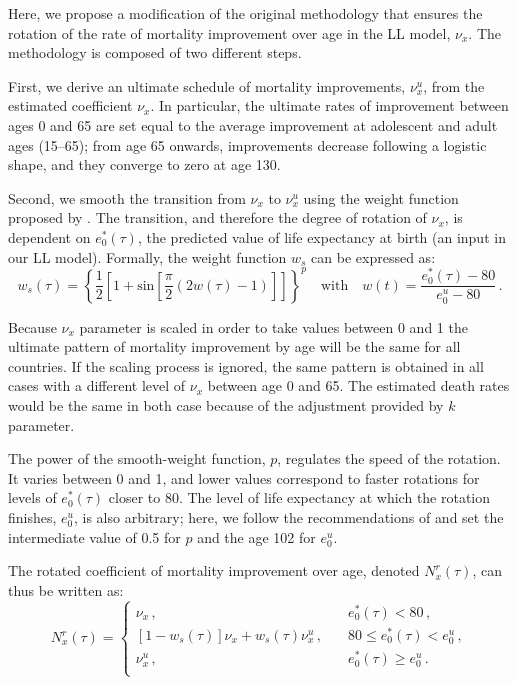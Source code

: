 \documentclass[risks,article,submit,moreauthors,pdftex]{Definitions/mdpi}
\begin{document}
Here, we propose a modification of the original \cite{li2013} methodology that ensures the rotation of the rate of mortality improvement over age in the LL model, $\nu_x$. The methodology is composed of two different steps.

First, we derive an ultimate schedule of mortality improvements, $\nu^u_x$,  from the estimated coefficient $\nu_x$. In particular, the ultimate rates of improvement between ages 0 and 65 are set equal to the average improvement at adolescent and adult ages (15--65); from age 65 onwards, improvements decrease following a logistic shape, and they converge to zero at age 130. 

Second, we smooth the transition from $\nu_x$ to $\nu^u_x$ using the weight function proposed by \cite{li2013}. The transition, and therefore the degree of rotation of $\nu_x$, is dependent on $e^*_0(\tau)$, the predicted value of life expectancy at birth (an input in our LL model). Formally, the weight function $w_s$ can be expressed as:
\begin{equation}
\label{Eq:ws}
  w_s(\tau)= \left \{ \frac{1}{2} \left [ 1 + \mathrm{sin}  \left [ \frac{\pi}{2} \left ( 2w(\tau) - 1 \right ) \right ]  \right ] \right \}^p \quad \textrm{with} \quad w(t) = \frac{e^*_0(\tau)-80}{e^u_0-80} \, .
\end{equation}

Because $\nu_x$ parameter is scaled in order to take values between 0 and 1 the ultimate pattern of mortality improvement by age will be the same for all countries. If the scaling process is ignored, the same pattern is obtained in all cases with a different level of $\nu_x$ between age 0 and 65. The estimated death rates would be the same in both case because of the adjustment provided by $k$ parameter.  

The power of the smooth-weight function, $p$, regulates the speed of the rotation. It varies between 0 and 1, and lower values correspond to faster rotations for levels of $e^*_0(\tau)$ closer to 80. The level of life expectancy at which the rotation finishes, $e^u_0$, is also arbitrary; here, we follow the recommendations of \cite{li2013} and set the intermediate value of 0.5 for $p$ and the age 102 for $e^u_0$.

The rotated coefficient of mortality improvement over age, denoted $N^r_x(\tau)$, can thus be written as: 
\begin{equation}
\label{Eq:Nrx}
  N^r_x(\tau) = \left\{ 
  \begin{array}{lll}
  \nu_x \, , \quad &  e^*_0(\tau) < 80 \, , \\
  \left [ 1- w_s(\tau) \right ]\nu_x + w_s(\tau) \nu^u_x \, , \quad & 80 \leq e^*_0(\tau) < e^u_0 \, , \\
  \nu^u_x \, , \quad & e^*_0(\tau) \geq e^u_0 \, . \\
  \end{array}
  \right.
\end{equation}



\end{document}
